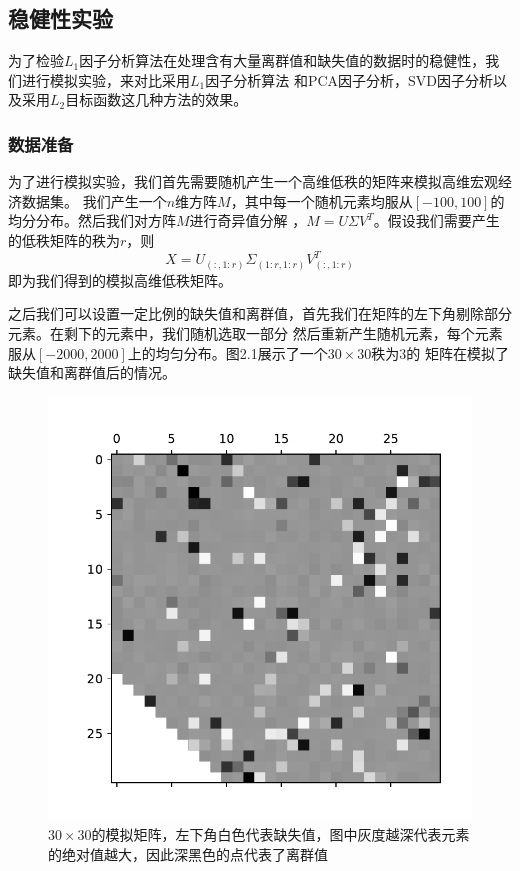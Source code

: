 \subsection{稳健性实验}
为了检验$L_1$因子分析算法在处理含有大量离群值和缺失值的数据时的稳健性，我们进行模拟实验，来对比采用$L_1$因子分析算法
和PCA因子分析，SVD因子分析以及采用$L_2$目标函数这几种方法的效果。

\subsubsection{数据准备}
为了进行模拟实验，我们首先需要随机产生一个高维低秩的矩阵来模拟高维宏观经济数据集。
我们产生一个$n$维方阵$M$，其中每一个随机元素均服从$[-100, 100]$的均分分布。然后我们对方阵$M$进行奇异值分解
，$M = U\Sigma V^{T}$。假设我们需要产生的低秩矩阵的秩为$r$，则$$X = U_{(:,1:r)}\Sigma_{(1:r,1:r)}V^T_{(:,1:r)}$$
即为我们得到的模拟高维低秩矩阵。

之后我们可以设置一定比例的缺失值和离群值，首先我们在矩阵的左下角剔除部分元素。在剩下的元素中，我们随机选取一部分
然后重新产生随机元素，每个元素服从$[-2000,2000]$上的均匀分布。图2.1展示了一个$30\times30$秩为3的
矩阵在模拟了缺失值和离群值后的情况。

\begin{figure}[H]
    \centering
    \includegraphics[width=.5\textwidth]{pics/matrix.pdf}
    \caption{\small $30\times30$的模拟矩阵，左下角白色代表缺失值，图中灰度越深代表元素的绝对值越大，因此深黑色的点代表了离群值}
    \label{fig2.1}
\end{figure}